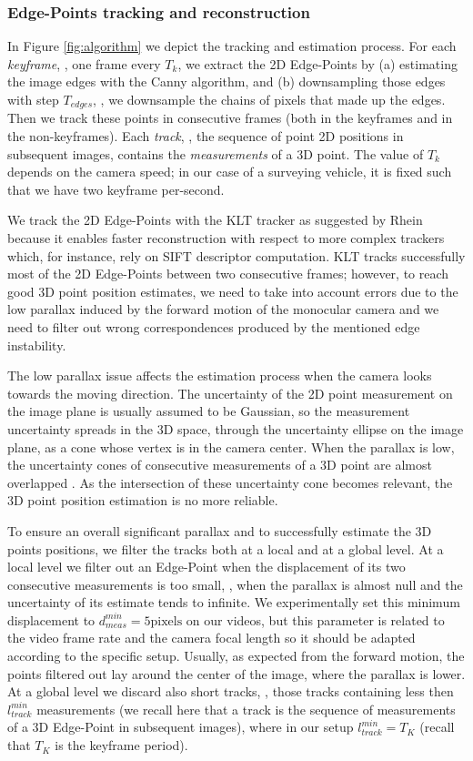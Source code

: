 \subsubsection{Edge-Points tracking and reconstruction}
\label{subsubsec:Edge-Point-tracking}
In Figure \ref{fig:algorithm} we depict the tracking and estimation process.
For each \emph{keyframe}, \ie, one frame every $T_k$, we extract the 2D Edge-Points by (a) estimating the image edges with the Canny algorithm, and (b) downsampling those edges with step $T_{edges}$, \ie, we downsample the chains of pixels that made up the edges. 
Then we track these points in consecutive frames (both in  the keyframes and in the non-keyframes). Each \emph{track}, \ie, the sequence of point 2D positions in subsequent images, contains the \emph{measurements} of a 3D point. The value of $T_k$ depends on the camera speed; in our case of a surveying vehicle, it is fixed such that we have two keyframe per-second. 


We track the 2D Edge-Points with the KLT tracker \cite{Lucas_Kanade81} as suggested by Rhein \etal \cite{Rhein_et_al13} because it enables faster reconstruction with respect to more complex trackers which, for instance, rely on SIFT descriptor computation.
KLT tracks successfully most of the 2D Edge-Points between two consecutive frames; however, to reach good 3D point position estimates, we need to take into account errors due to the low parallax induced by the forward motion of the monocular camera and we need to filter out wrong correspondences produced by the mentioned edge instability. 


The low parallax issue affects the estimation process when the camera looks towards the moving direction. The uncertainty of the 2D point measurement on the image plane is usually assumed to be Gaussian, so the measurement uncertainty spreads in the 3D space, through the uncertainty ellipse on the image plane, as a cone whose vertex is in the camera center. 
When the parallax is low, the uncertainty cones of consecutive measurements of a 3D point are almost overlapped \cite{hazi04}. As the intersection of these uncertainty cone becomes relevant, the 3D point position estimation is no more reliable.

To ensure  an overall significant parallax and to successfully estimate the 3D points positions, we filter the tracks  both at a local and at a global level.
At a local level we filter out an Edge-Point when the displacement of its two consecutive measurements is too small, \ie, when the parallax is almost null and the uncertainty of its estimate tends to infinite. 
We experimentally set this minimum displacement to $d_{meas}^{min} = 5 \text{pixels}$ on our videos, but this parameter is related to the video frame rate and the camera focal length so it should be adapted according to the specific setup. 
Usually, as expected from the forward motion, the points filtered out lay around the center of the image, where the parallax is lower.
At a global level we discard also short tracks, \ie, those tracks containing less then $l_{track}^{min}$ measurements (we recall here that a track is the sequence of measurements of a 3D Edge-Point in subsequent images), where in our setup $l_{track}^{min} = T_K$ (recall that $T_K$ is the keyframe period). 



